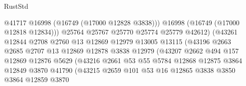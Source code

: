 \begin{lexlean}{RustStd}
\begin{coremodule}
                                      @41717
                                      @16998
                                      (@16749 (@17000 @12828 @3838)))
                                    @16998
                                    (@16749 (@17000 @12818 @12834)))
                                  @25764
                                  @25767
                                  @25770
                                  @25774
                                  @25779
                                  @42612)
                                (@43261
                                  @12844
                                  @2708
                                  @2760
                                  @13
                                  @12869
                                  @12979
                                  @13005
                                  @13115
                                  (@43196
                                    @2663
                                    @2685
                                    @2707
                                    @13
                                    @12869
                                    @12878
                                    @3838
                                    @12979
                                    (@43207
                                      @2662
                                      @494
                                      @157
                                      @12869
                                      @12876
                                      @5629
                                      (@43216
                                        @2661
                                        @53
                                        @55
                                        @5784
                                        @12868
                                        @12875
                                        @3864
                                        @12849
                                        @3870
                                        @41790
                                        (@43215
                                          @2659
                                          @101
                                          @53
                                          @16
                                          @12865
                                          @3838
                                          @3850
                                          @3864
                                          @12859
                                          @3870

\end{coremodule}
\end{lexlean}
